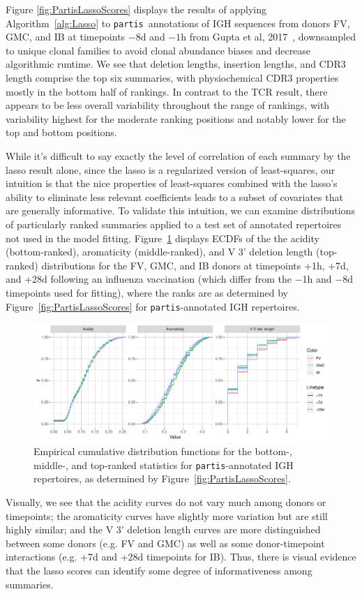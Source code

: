 \documentclass{article}
\newcommand{\partis}{\texttt{partis}}
\begin{document}
Figure \ref{fig:PartisLassoScores} displays the results of applying Algorithm~\ref{alg:Lasso} to \partis\ annotations of IGH sequences from donors FV, GMC, and IB at timepoints $-8$d and $-1$h from Gupta et al, 2017~\cite{Gupta2017-ve}, downsampled to unique clonal families to avoid clonal abundance biases and decrease algorithmic runtime.
We see that deletion lengths, insertion lengths, and CDR3 length comprise the top six summaries, with physiochemical CDR3 properties mostly in the bottom half of rankings.
In contrast to the TCR result, there appears to be less overall variability throughout the range of rankings, with variability highest for the moderate ranking positions and notably lower for the top and bottom positions.

While it's difficult to say exactly the level of correlation of each summary by the lasso result alone, since the lasso is a regularized version of least-squares, our intuition is that the nice properties of least-squares combined with the lasso's ability to eliminate less relevant coefficients leads to a subset of covariates that are generally informative.
To validate this intuition, we can examine distributions of particularly ranked summaries applied to a test set of annotated repertoires not used in the model fitting.
Figure~\ref{fig:LassoValidation} displays ECDFs of the the acidity (bottom-ranked), aromaticity (middle-ranked), and V 3' deletion length (top-ranked) distributions for the FV, GMC, and IB donors at timepoints +1h, +7d, and +28d following an influenza vaccination (which differ from the $-$1h and $-$8d timepoints used for fitting), where the ranks are as determined by Figure~\ref{fig:PartisLassoScores} for \partis-annotated IGH repertoires.
\begin{figure}
	\includegraphics[width=\linewidth]{Figures/Lasso/validation_ecdfs.pdf}
	\caption{Empirical cumulative distribution functions for the bottom-, middle-, and top-ranked statistics for \partis-annotated IGH repertoires, as determined by Figure~\ref{fig:PartisLassoScores}.}
	\label{fig:LassoValidation}
\end{figure}
Visually, we see that the acidity curves do not vary much among donors or timepoints; the aromaticity curves have slightly more variation but are still highly similar; and the V 3' deletion length curves are more distinguished between some donors (e.g. FV and GMC) as well as some donor-timepoint interactions (e.g. +7d and +28d timepoints for IB).
Thus, there is visual evidence that the lasso scores can identify some degree of informativeness among summaries.
\end{document}
